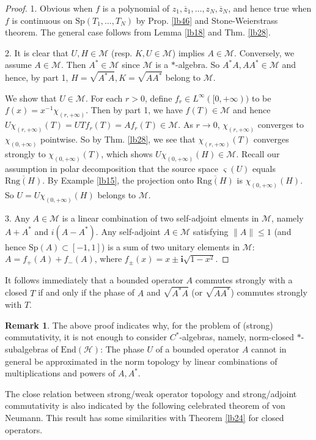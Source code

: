 \documentclass[12pt,a4paper,notitlepage]{article}
\theoremstyle{definition}
\newtheorem{rem}[df]{Remark}
\theoremstyle{plain}
\newcommand{\mc}{\mathcal}
\newcommand{\ovl}{\overline}
\newcommand{\End}{\mathrm{End}} %
\newcommand{\im}{\mathbf{i}}
\newcommand{\sgm}{\varsigma}
\newcommand{\Sp}{\mathrm{Sp}}
\newcommand{\Rng}{\mathrm{Rng}}
\numberwithin{equation}{section}
\begin{document}
\begin{proof}
1. Obvious when $f$ is a polynomial of $z_1,\ovl z_1,\dots,z_N,\ovl z_N$, and hence true when $f$ is continuous on  $\Sp(T_1,\dots,T_N)$ by Prop. \ref{lb46} and Stone-Weierstrass theorem. The general case follows from Lemma \ref{lb18} and Thm. \ref{lb28}.

2. It is clear that $U,H\in\mc M$ (resp. $K,U\in\mc M$)  implies $A\in\mc M$. Conversely, we assume $A\in\mc M$. Then $A^*\in\mc M$ since $\mc M$ is a $*$-algebra. So $A^*A,AA^*\in\mc M$ and hence, by part 1, $H=\sqrt{A^*A},K=\sqrt{AA^*}$ belong to $\mc M$.

We show that $U\in \mc M$. For each $r>0$, define $f_r\in L^\infty([0,+\infty))$ to be $f(x)=x^{-1}\chi_{(r,+\infty)}$. Then by part 1, we have $f(T)\in\mc M$ and hence $U\chi_{(r,+\infty)}(T)=UTf_r(T)=Af_r(T)\in\mc M$. As $r\rightarrow 0$, $\chi_{(r,+\infty)}$ converges to $\chi_{(0,+\infty)}$ pointwise. So by Thm. \ref{lb28}, we see that $\chi_{(r,+\infty)}(T)$ converges strongly to $\chi_{(0,+\infty)}(T)$, which shows $U\chi_{(0,+\infty)}(H)\in\mc M$. Recall our assumption in polar decomposition that the source space $\sgm(U)$ equals $\ovl{\Rng(H)}$. By Example \ref{lb15}, the projection onto $\ovl{\Rng(H)}$ is $\chi_{(0,+\infty)}(H)$. So $U=U\chi_{(0,+\infty)}(H)$ belongs to $\mc M$.

3. Any $A\in\mc M$ is a linear combination of two self-adjoint elments in $\mc M$, namely $A+A^*$ and $i(A-A^*)$. Any self-adjoint $A\in\mc M$ satisfying $\lVert A\lVert \leq1$ (and hence $\Sp(A)\subset[-1,1]$) is a sum of two unitary elements in $\mc M$: $A=f_+(A)+f_-(A)$, where $f_\pm(x)=x\pm\im\sqrt{1-x^2}$.
\end{proof}


It follows immediately that a bounded operator $A$ commutes strongly with a closed $T$ if and only if the phase of $A$ and $\sqrt{A^*A}$ (or $\sqrt{AA^*}$) commutes strongly with $T$.


\begin{rem}
The above proof indicates why, for the problem of (strong) commutativity, it is not enough to consider $C^*$-algebras, namely, norm-closed $*$-subalgebras of $\End(\mc H)$: The phase $U$ of a bounded operator $A$ cannot in general be approximated in the norm topology by linear combinations of multiplications and powers of $A,A^*$.
\end{rem}


The close relation between strong/weak operator topology and strong/adjoint commutativity is also indicated by the following celebrated theorem of von Neumann. This result has some similarities with Theorem \ref{lb24} for closed operators.
\end{document}
